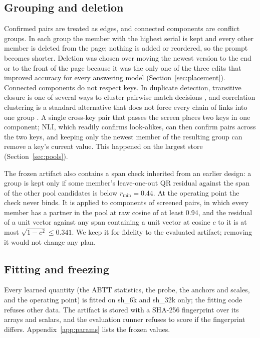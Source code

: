 \documentclass{CUP-JNL-NLP}
\newcommand{\sub}[1]{\textsf{sh\_#1}}                    %
\begin{document}
\subsection{Grouping and deletion}
\label{sec:group}

Confirmed pairs are treated as edges, and connected components are conflict groups. In each group the member with the highest serial is kept and every other member is deleted from the page; nothing is added or reordered, so the prompt becomes shorter. Deletion was chosen over moving the newest version to the end or to the front of the page because it was the only one of the three edits that improved accuracy for every answering model (Section~\ref{sec:placement}). Connected components do not respect keys. In duplicate detection, transitive closure is one of several ways to cluster pairwise match decisions \citep{hassanzadeh2009framework}, and correlation clustering is a standard alternative that does not force every chain of links into one group \citep{bansal2004correlation}. A single cross-key pair that passes the screen places two keys in one component; NLI, which readily confirms look-alikes, can then confirm pairs across the two keys, and keeping only the newest member of the resulting group can remove a key's current value. This happened on the largest store (Section~\ref{sec:pools}).

The frozen artifact also contains a span check inherited from an earlier design: a group is kept only if some member's leave-one-out QR residual against the span of the other pool candidates is below $r_{\min}=0.44$. At the operating point the check never binds. It is applied to components of screened pairs, in which every member has a partner in the pool at raw cosine of at least 0.94, and the residual of a unit vector against any span containing a unit vector at cosine $c$ to it is at most $\sqrt{1-c^{2}}\le0.341$. We keep it for fidelity to the evaluated artifact; removing it would not change any plan.

\subsection{Fitting and freezing}
\label{sec:freeze}

Every learned quantity (the ABTT statistics, the probe, the anchors and scales, and the operating point) is fitted on \sub{6k} and \sub{32k} only; the fitting code refuses other data. The artifact is stored with a SHA-256 fingerprint over its arrays and scalars, and the evaluation runner refuses to score if the fingerprint differs. Appendix~\ref{app:params} lists the frozen values.
\end{document}
